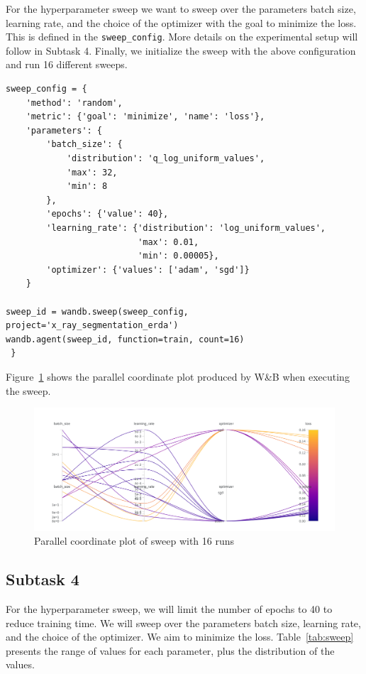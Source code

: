  For the hyperparameter sweep we want to sweep over the parameters batch size, learning rate, and the choice of the optimizer with the goal to minimize the loss. This is defined in the \lstinline|sweep_config|. More details on the experimental setup will follow in Subtask 4. Finally, we initialize the sweep with the above configuration and run 16 different sweeps. 


\begin{lstlisting}
sweep_config = {
    'method': 'random',
    'metric': {'goal': 'minimize', 'name': 'loss'},
    'parameters': {
        'batch_size': {
            'distribution': 'q_log_uniform_values',
            'max': 32,
            'min': 8
        },
        'epochs': {'value': 40},
        'learning_rate': {'distribution': 'log_uniform_values',
                          'max': 0.01,
                          'min': 0.00005},
        'optimizer': {'values': ['adam', 'sgd']}
    }

sweep_id = wandb.sweep(sweep_config, project='x_ray_segmentation_erda')
wandb.agent(sweep_id, function=train, count=16)
 }
\end{lstlisting}

Figure~\ref{fig:sweep} shows the parallel coordinate plot produced by W\&B when executing the sweep.

\begin{figure}
    \centering
    \includegraphics[width=\textwidth]{./Images/sweep.png}
    \caption{Parallel coordinate plot of sweep with 16 runs}
    \label{fig:sweep}
\end{figure}



\subsection*{Subtask 4}

For the hyperparameter sweep, we will limit the number of epochs to 40 to reduce training time. We will sweep over the parameters batch size, learning rate, and the choice of the optimizer. We aim to minimize the loss. Table~\ref{tab:sweep} presents the range of values for each parameter, plus the distribution of the values.

